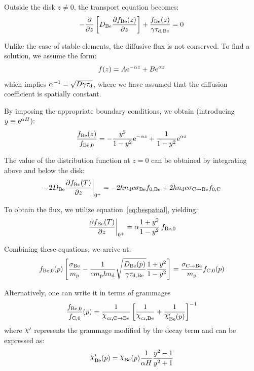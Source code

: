 Outside the disk $z \neq 0$, the transport equation becomes:
%
\begin{equation}
-\frac{\partial}{\partial z} \left[ D_{\rm Be} \frac{\partial f_{\rm Be}(z)}{\partial z} \right] + \frac{f_{\rm Be}(z)}{\gamma\tau_{\rm d, Be}} = 0
\end{equation}

Unlike the case of stable elements, the diffusive flux is not conserved. 
%
To find a solution, we assume the form:
%
\begin{equation}
f(z) = A {\rm e}^{-\alpha z} + B {\rm e}^{\alpha z}
\end{equation}
%
which implies $\alpha^{-1} = \sqrt{D \gamma\tau_{\rm d}}$, where we have assumed that the diffusion coefficient is spatially constant.

By imposing the appropriate boundary conditions, we obtain (introducing $y \equiv {\rm e}^{\alpha H}$):
%
\begin{equation}
\frac{f_{\rm Be}(z)}{f_{\rm Be,0}} =  -\frac{y^2}{1 - y^2} {\rm e}^{-\alpha z} + \frac{1}{1- y^2} {\rm e}^{\alpha z} 
\label{eq:bespatial}
\end{equation}

The value of the distribution function at $z=0$ can be obtained by integrating above and below the disk:
%
\begin{equation}
\left. -2 D_{\rm Be} \frac{\partial f_{\rm Be}(T)}{\partial z} \right|_{0^+} =
- 2 h n_{\rm d} c \sigma_{\rm Be} f_{0, \rm Be}
+ 2 h n_{\rm d} c \sigma_{\rm C \rightarrow Be} f_{0, \rm C} 
\end{equation}

To obtain the flux, we utilize equation~\eqref{eq:bespatial}, yielding:
%
\begin{equation}
\left. \frac{\partial f_{\rm Be}(T)}{\partial z} \right|_{0^+} = \alpha \frac{1+y^2}{1-y^2} \, f_{\rm Be,0}
\end{equation}

Combining these equations, we arrive at:
%
\begin{equation}
f_{\rm Be,0}(p) \left[  \frac{\sigma_{\rm Be}}{m_{\rm p}} - \frac{1}{c m_{\rm p} h n_{\rm d}} \sqrt{\frac{D_{\rm Be}(p)}{\gamma \tau_{\rm d, Be}}} \frac{1+y^2}{1-y^2} \right] = 
\frac{\sigma_{\rm C\rightarrow Be}}{m_{\rm p}} f_{\rm C,0}(p)
\end{equation}

Alternatively, one can write it in terms of grammages
%
\begin{equation}
\frac{f_{\rm Be,0}}{f_{\rm C,0}}(p) = 
\frac{1}{\rchi_{\rm cr, C \rightarrow Be}}  \left[  \frac{1}{\rchi_{\rm cr, Be}} + \frac{1}{\rchi_{\rm Be}^\prime(p)} \right]^{-1}  
\end{equation}
%
where $\rchi^\prime$ represents the grammage modified by the decay term and can be expressed as:
%
\begin{equation}
\rchi^\prime_{\rm Be}(p) = \rchi_{\rm Be}(p) \frac{1}{\alpha H} \frac{y^2 - 1}{y^2 + 1} 
\end{equation}

